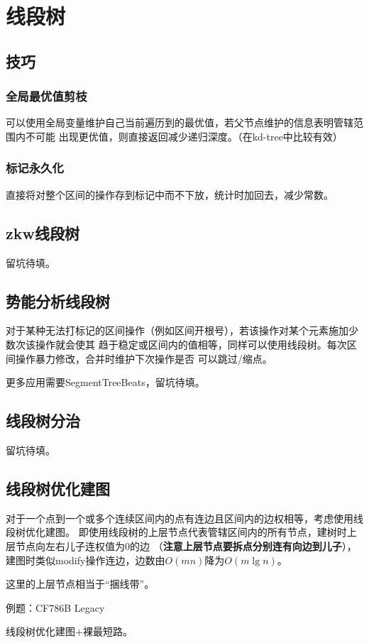 \section{线段树}
\subsection{技巧}
\subsubsection{全局最优值剪枝}
可以使用全局变量维护自己当前遍历到的最优值，若父节点维护的信息表明管辖范围内不可能
出现更优值，则直接返回减少递归深度。（在kd-tree中比较有效）
\subsubsection{标记永久化}
直接将对整个区间的操作存到标记中而不下放，统计时加回去，减少常数。
\subsection{zkw线段树}
留坑待填。
\subsection{势能分析线段树}
对于某种无法打标记的区间操作（例如区间开根号），若该操作对某个元素施加少数次该操作就会使其
趋于稳定或区间内的值相等，同样可以使用线段树。每次区间操作暴力修改，合并时维护下次操作是否
可以跳过/缩点。

更多应用需要SegmentTreeBeats，留坑待填。
\subsection{线段树分治}
留坑待填。
\subsection{线段树优化建图}
对于一个点到一个或多个连续区间内的点有连边且区间内的边权相等，考虑使用线段树优化建图。
即使用线段树的上层节点代表管辖区间内的所有节点，建树时上层节点向左右儿子连权值为0的边
（{\bfseries 注意上层节点要拆点分别连有向边到儿子}），
建图时类似modify操作连边，边数由$O(mn)$降为$O(m\lg n)$。

这里的上层节点相当于``捆线带''。

例题：CF786B Legacy

线段树优化建图+裸最短路。



